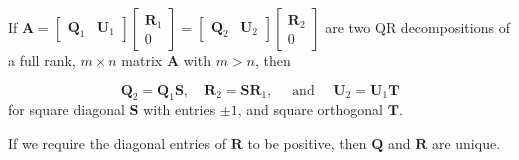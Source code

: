 \begin{theorem}[$m>n $矩阵$A$进行QR分解的唯一性]

    If $\boldsymbol{A}=\left[\begin{array}{ll}\boldsymbol{Q}_{1} & \boldsymbol{U}_{1}\end{array}\right]\left[\begin{array}{c}\boldsymbol{R}_{1} \\ 0\end{array}\right]=\left[\begin{array}{ll}\boldsymbol{Q}_{2} & \boldsymbol{U}_{2}\end{array}\right]\left[\begin{array}{c}\boldsymbol{R}_{2} \\ 0\end{array}\right]$ are two QR decompositions of a full rank, $m \times n$ matrix ${\boldsymbol{A}}$ with $m>n$, then

$$
\boldsymbol{Q}_{2}=\boldsymbol{Q}_{1} \boldsymbol{S}, \quad \boldsymbol{R}_{2}=\boldsymbol{S} \boldsymbol{R}_{1}, \quad \text { and } \quad \boldsymbol{U}_{2}=\boldsymbol{U}_{1} \boldsymbol{T}
$$
for square diagonal $\boldsymbol{S}$ with entries $\pm 1$, and square orthogonal $\boldsymbol{T}$. 

If we require the diagonal entries of $\boldsymbol{R}$ to be positive, then $\boldsymbol{Q}$ and $\boldsymbol{R}$ are unique.
\end{theorem}

